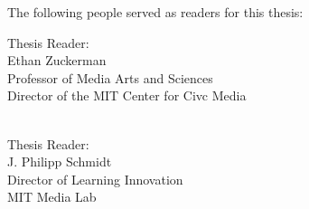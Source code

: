 \begin{titlepage}
      {\setlength{\parindent}{0cm}
        \large  


        \hfill







        \vfill        

        The following people served as readers for this thesis:
        \\ \bigskip

 

        Thesis Reader:\\
        Ethan Zuckerman\\
        Professor of Media Arts and Sciences\\
        Director of the MIT Center for Civc Media\\
        \\ \bigskip

        Thesis Reader:\\
        J. Philipp Schmidt\\
        Director of Learning Innovation\\
        MIT Media Lab\\    

        





        }
\end{titlepage}   
